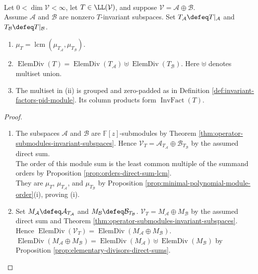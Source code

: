 \begin{theorem} \label{thm:reducing-decompositions-combine-elementary-divisors} \\
Let $0<\dim\mathcal{V}<\infty$, let $T\in\LL(\mathcal{V})$, and suppose $\mathcal{V}=\mathcal{A}\oplus\mathcal{B}$.\\
Assume $\mathcal{A}$ and $\mathcal{B}$ are nonzero $T$-invariant subspaces. Set $T_{\mathcal{A}}\defeq T|_{\mathcal{A}}$ and $T_{\mathcal{B}}\defeq T|_{\mathcal{B}}$.
\begin{enumerate}[label=(\roman*)]
\setlength{\itemsep}{0pt}
\item $\mu_T=\operatorname{lcm}(\mu_{T_{\mathcal{A}}},\mu_{T_{\mathcal{B}}})$.
\item $\operatorname{ElemDiv}(T)=\operatorname{ElemDiv}(T_{\mathcal{A}})\uplus\operatorname{ElemDiv}(T_{\mathcal{B}})$. Here $\uplus$ denotes multiset union.
\item The multiset in (ii) is grouped and zero-padded as in Definition \ref{def:invariant-factors-pid-module}. Its column products form $\operatorname{InvFact}(T)$.
\end{enumerate}
\begin{proof}
\begin{enumerate}[label=(\roman*)]
\setlength{\itemsep}{0pt}
\item The subspaces $\mathcal{A}$ and $\mathcal{B}$ are $\mathbb{F}[z]$-submodules by Theorem \ref{thm:operator-submodules-invariant-subspaces}. Hence $\mathcal{V}_T=\mathcal{A}_{T_{\mathcal{A}}}\oplus\mathcal{B}_{T_{\mathcal{B}}}$ by the assumed direct sum.\\
The order of this module sum is the least common multiple of the summand orders by Proposition \ref{prop:orders-direct-sum-lcm}.\\
They are $\mu_T$, $\mu_{T_{\mathcal{A}}}$, and $\mu_{T_{\mathcal{B}}}$ by Proposition \ref{prop:minimal-polynomial-module-order}(i), proving (i).
\item Set $M_{\mathcal{A}}\defeq\mathcal{A}_{T_{\mathcal{A}}}$ and $M_{\mathcal{B}}\defeq\mathcal{B}_{T_{\mathcal{B}}}$. $\mathcal{V}_T=M_{\mathcal{A}}\oplus M_{\mathcal{B}}$ by the assumed direct sum and Theorem \ref{thm:operator-submodules-invariant-subspaces}.\\
Hence $\operatorname{ElemDiv}(\mathcal{V}_T)=\operatorname{ElemDiv}(M_{\mathcal{A}}\oplus M_{\mathcal{B}})$. $\operatorname{ElemDiv}(M_{\mathcal{A}}\oplus M_{\mathcal{B}})=\operatorname{ElemDiv}(M_{\mathcal{A}})\uplus\operatorname{ElemDiv}(M_{\mathcal{B}})$ by Proposition \ref{prop:elementary-divisors-direct-sums}.\\

\end{enumerate}
\end{proof}
\end{theorem}
